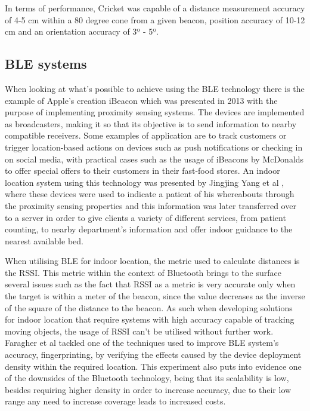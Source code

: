   
In terms of performance, Cricket was capable of a distance measurement accuracy of 4-5 cm within a 80 degree cone from a given beacon, position accuracy of 10-12 cm and an orientation accuracy of 3º - 5º.  
  
  
\subsection{BLE systems}  
\label{subsec:ble}  
When looking at what's possible to achieve using the BLE technology there is the example of Apple's creation iBeacon \cite{ibeacon} which was presented in 2013 with the purpose of implementing proximity sensing systems. The devices are implemented as broadcasters, making it so that its objective is to send information to nearby compatible receivers. Some examples of application are to track customers or trigger location-based actions on devices such as push notifications or checking in on social media, with practical cases such as the usage of iBeacons by McDonalds to offer special offers to their customers in their fast-food stores. An indoor location system using this technology was presented by Jingjing Yang et al \cite{ibeacon1}, where these devices were used to indicate a patient of his whereabouts through the proximity sensing properties and this information was later transferred over to a server in order to give clients a variety of different services, from patient counting, to nearby department's information and offer indoor guidance to the nearest available bed.   
  
  
When utilising BLE for indoor location, the metric used to calculate distances is the RSSI. This metric within the context of Bluetooth brings to the surface several issues such as the fact that RSSI as a metric is very accurate only when the target is within a meter of the beacon, since the value decreases as the inverse of the square of the distance to the beacon. As such when developing solutions for indoor location that require systems with high accuracy capable of tracking moving objects, the usage of RSSI can't be utilised without further work. Faragher et al \cite{bleacc} tackled one of the techniques used to improve BLE system's accuracy, fingerprinting, by verifying the effects caused by the device deployment density within the required location. This experiment also puts into evidence one of the downsides of the Bluetooth technology, being that its scalability is low, besides requiring higher density in order to increase accuracy, due to their low range any need to increase coverage leads to increased costs.  
  

